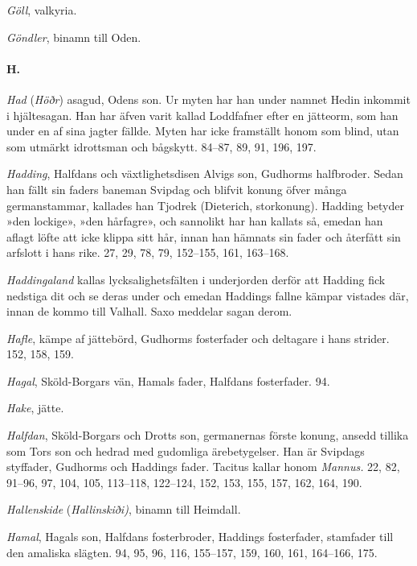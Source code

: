 \emph{Göll}, valkyria.

\emph{Göndler}, binamn till Oden.

\paragraph{H.}

\emph{Had} (\emph{Höðr}) asagud, Odens son. Ur myten har han under
namnet Hedin inkommit i hjältesagan. Han har äfven varit kallad
Loddfafner efter en jätteorm, som han under en af sina jagter fällde.
Myten har icke framställt honom som blind, utan som utmärkt idrottsman
och bågskytt. 84--87, 89, 91, 196, 197.

\emph{Hadding}, Halfdans och växtlighetsdisen Alvigs son, Gudhorms
halfbroder. Sedan han fällt sin faders baneman Svipdag och blifvit
konung öfver många germanstammar, kallades han Tjodrek (Dieterich,
storkonung). Hadding betyder »den lockige», »den hårfagre», och
sannolikt har han kallats så, emedan han aflagt löfte att icke klippa
sitt hår, innan han hämnats sin fader och återfått sin arfslott i hans
rike. 27, 29, 78, 79, 152--155, 161, 163--168.

\emph{Haddingaland} kallas lycksalighetsfälten i underjorden derför att
Hadding fick nedstiga dit och se deras under och emedan Haddings fallne
kämpar vistades där, innan de kommo till Valhall. Saxo meddelar sagan
derom.

\protect\hypertarget{lb1625905.xhtmlux5cux23start222}{}{}\protect\hypertarget{lb1625905.xhtmlux5cux23start222-a}{}{}\protect\hypertarget{lb1625905.xhtmlux5cux23start222-b}{}{}\protect\hypertarget{lb1625905.xhtmlux5cux23start222-c}{}{}\protect\hypertarget{lb1625905.xhtmlux5cux23start222-d}{}{}

\emph{Hafle}, kämpe af jättebörd, Gudhorms fosterfader och deltagare i
hans strider. 152, 158, 159.

\emph{Hagal}, Sköld-Borgars vän, Hamals fader, Halfdans fosterfader. 94.

\emph{Hake}, jätte.

\emph{Halfdan}, Sköld-Borgars och Drotts son, germanernas förste konung,
ansedd tillika som Tors son och hedrad med gudomliga ärebetygelser. Han
är Svipdags styffader, Gudhorms och Haddings fader. Tacitus kallar honom
\emph{Mannus.} 22, 82, 91--96, 97, 104, 105, 113--118, 122--124, 152,
153, 155, 157, 162, 164, 190.

\emph{Hallenskide} (\emph{Hallinskiði)}, binamn till Heimdall.

\emph{Hamal}, Hagals son, Halfdans fosterbroder, Haddings fosterfader,
stamfader till den amaliska slägten. 94, 95, 96, 116, 155--157, 159,
160, 161, 164--166, 175.

